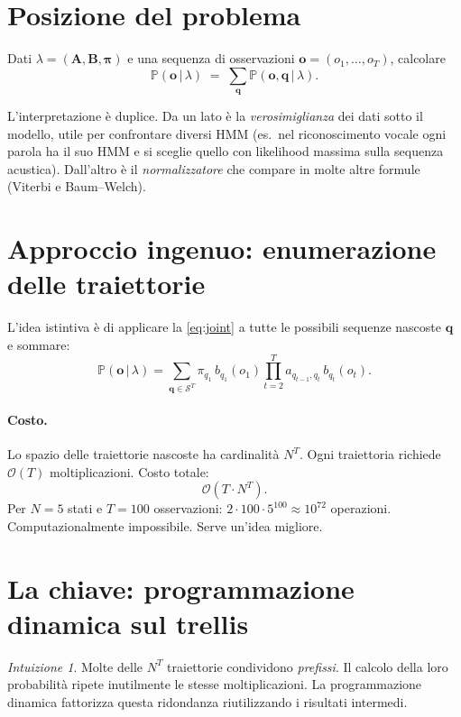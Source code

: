 \documentclass[11pt,a4paper,oneside]{book}
\theoremstyle{plain}
\theoremstyle{definition}
\theoremstyle{remark}
\newtheorem*{intuizione}{Intuizione}
\newcommand{\Prob}{\mathbb{P}}
\newcommand{\states}{\mathcal{S}}            %
\newcommand{\Amat}{\mathbf{A}}               %
\newcommand{\Bmat}{\mathbf{B}}               %
\newcommand{\initvec}{\boldsymbol{\pi}}      %
\newcommand{\hmm}{\lambda}                   %
\newcommand{\Nstates}{N}                     %
\newcommand{\Tlen}{T}                        %
\newcommand{\seqobs}{\mathbf{o}}             %
\newcommand{\seqstates}{\mathbf{q}}          %
\newcommand{\given}{\,\vert\,}
\begin{document}
\section{Posizione del problema}

\begin{tcolorbox}[notebox,title=Problema 1 -- Evaluation]
Dati $\hmm=(\Amat,\Bmat,\initvec)$ e una sequenza di osservazioni
$\seqobs=(o_1,\dots,o_{\Tlen})$, calcolare
\[
    \Prob(\seqobs\given\hmm)
    \;=\; \sum_{\seqstates}\Prob(\seqobs,\seqstates\given\hmm).
\]
\end{tcolorbox}

L'interpretazione è duplice. Da un lato è la \emph{verosimiglianza}
dei dati sotto il modello, utile per confrontare diversi HMM (es.\
nel riconoscimento vocale ogni parola ha il suo HMM e si sceglie
quello con likelihood massima sulla sequenza acustica). Dall'altro è
il \emph{normalizzatore} che compare in molte altre formule (Viterbi
e Baum--Welch).

\section{Approccio ingenuo: enumerazione delle traiettorie}

L'idea istintiva è di applicare la \eqref{eq:joint} a tutte le possibili
sequenze nascoste $\seqstates$ e sommare:
\begin{equation}
    \Prob(\seqobs\given\hmm)
    = \sum_{\seqstates\in\states^{\Tlen}}
      \pi_{q_1}\,b_{q_1}(o_1)\prod_{t=2}^{\Tlen} a_{q_{t-1},q_t}\,b_{q_t}(o_t).
    \label{eq:naive_evaluation}
\end{equation}

\paragraph{Costo.} Lo spazio delle traiettorie nascoste ha cardinalità
$\Nstates^{\Tlen}$. Ogni traiettoria richiede $\mathcal{O}(\Tlen)$
moltiplicazioni. Costo totale:
\[
    \mathcal{O}(\Tlen\cdot\Nstates^{\Tlen}).
\]
Per $\Nstates=5$ stati e $\Tlen=100$ osservazioni:
$2\cdot 100\cdot 5^{100} \approx 10^{72}$ operazioni. Computazionalmente
impossibile. Serve un'idea migliore.

\section{La chiave: programmazione dinamica sul trellis}

\begin{intuizione}
Molte delle $\Nstates^{\Tlen}$ traiettorie condividono \emph{prefissi}.
Il calcolo della loro probabilità ripete inutilmente le stesse
moltiplicazioni. La programmazione dinamica fattorizza questa
ridondanza riutilizzando i risultati intermedi.
\end{intuizione}
\end{document}
